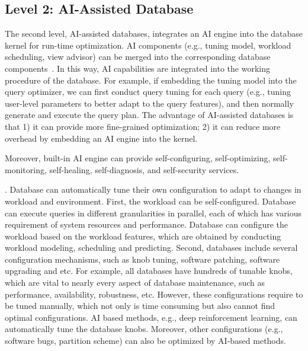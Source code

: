 \subsection{Level 2: AI-Assisted Database}
\label{subsec: assisted}

The second level, AI-assisted databases, integrates an AI engine into the database kernel for run-time optimization. AI components (e.g., tuning model, workload scheduling, view advisor) can be merged into the corresponding database components~\cite{DBLP:journals/corr/abs-1903-01363}. In this way, AI capabilities are integrated into the working procedure of the database. For example, if embedding the tuning model into the query optimizer, we can first conduct query tuning for each query (e.g., tuning user-level parameters to better adapt to the query features), and then normally generate and execute the query plan. The advantage of AI-assisted databases is that 1) it can provide more fine-grained optimization; 2) it can reduce more overhead by embedding an AI engine into the kernel. 


Moreover, built-in AI engine can provide self-configuring, self-optimizing, self-monitoring, self-healing, self-diagnosis, and self-security services. 

. Database can automatically tune their own configuration to adapt to changes in workload and environment. First, the workload can be  self-configured. Database can execute queries in different granularities in parallel, each of which has various requirement of system resources and performance. Database can configure the workload based on the workload features, which are obtained by conducting workload modeling, scheduling and predicting. Second, databases include several configuration mechanisms, such as knob tuning, software patching, software upgrading and etc. For example, all databases have hundreds of tunable knobs, which are vital to nearly every aspect of database maintenance, such as performance, availability, robustness, etc. However, these configurations require to be tuned manually, which not only is time consuming but also cannot find optimal configurations. AI based methods, e.g., deep reinforcement learning, can automatically tune the database knobs. Moreover, other configurations (e.g., software bugs, partition scheme) can also be optimized by AI-based methods. 

